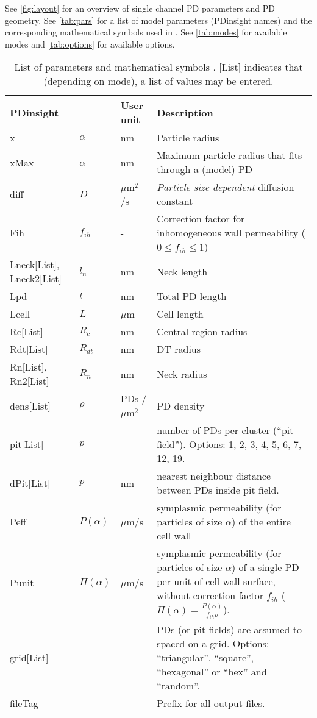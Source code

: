 \documentclass[a4paper,12pt]{article}
\newcommand{\SEL}{\bar{\alpha}}
\newcommand{\patchy}{f_{ih}}
\begin{document}
See \autoref{fig:layout} for an overview of single channel PD parameters and PD geometry. See \autoref{tab:pars} for a list of model parameters (PDinsight names) and the corresponding mathematical symbols used in \citet{Deinum.e19}. See \autoref{tab:modes} for available modes and \autoref{tab:options} for available options.

\begin{table}
\caption{List of parameters and mathematical symbols \citep{Deinum.e19}. [List] indicates that (depending on mode), a list of values may be entered.}
\label{tab:pars}
\begin{tabular}{l l l p{}}
PDinsight&& User unit & Description\\
\hline
x&$\alpha$ & nm &Particle radius \\
xMax &$\SEL$ & nm &Maximum particle radius that fits through a (model) PD \\
diff&$D$ &  $\mu$m$^2$/s &\emph{Particle size dependent} diffusion constant\\
Fih&$\patchy$ & - & Correction factor for inhomogeneous wall permeability ($0\leq\patchy\leq1$)\\
Lneck[List], Lneck2[List]&$l_n$ & nm& Neck length\\
Lpd&$l$ & nm &Total PD length\\
Lcell&$L$ & $\mu$m &Cell length\\
Rc[List]&$R_c$ &  nm & Central region radius\\
Rdt[List]&$R_{dt}$ &  nm & DT radius\\
Rn[List], Rn2[List]&$R_n$ &  nm & Neck radius\\
dens[List]&$\rho$ & PDs /$\mu$m$^2$ & PD density\\
pit[List]&$p$ & - & number of PDs per cluster (``pit field''). Options: 1, 2, 3, 4, 5, 6, 7, 12, 19.\\
dPit[List]&$p$ & nm & nearest neighbour distance between PDs inside pit field. \\ 
Peff&$P(\alpha)$ &$\mu$m/s& symplasmic permeability (for particles of size $\alpha$) of the entire cell wall\\
Punit&$\Pi(\alpha)$ &$\mu$m/s& symplasmic permeability (for particles of size $\alpha$) of a single PD per unit of cell wall surface, without correction factor $\patchy$ ($\Pi(\alpha) = \frac{P(\alpha)}{\patchy\rho}$).\\
grid[List]&&&PDs (or pit fields) are assumed to spaced on a grid. Options: ``triangular'', ``square'', ``hexagonal'' or ``hex'' and ``random''.\\
fileTag &&& Prefix for all output files. \\
\end{tabular}
\end{table}
\end{document}
